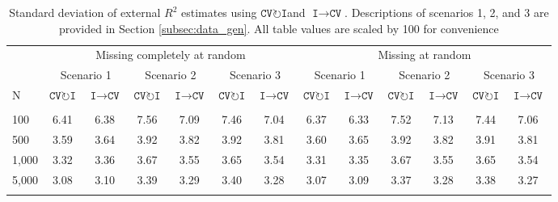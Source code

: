 \documentclass[AMA,STIX1COL,doublespace]{WileyNJD-v2}
\begin{document}
\begin{table}

\caption{\label{tab:variance}Standard deviation of external $R^2$ estimates using $\texttt{CV}\!\circlearrowright\!\texttt{I}$\space and $\texttt{I}\!\!\rightarrow\!\texttt{CV}$. Descriptions of scenarios 1, 2, and 3 are provided in Section \ref{subsec:data_gen}. All table values are scaled by 100 for convenience}
\centering
\begin{tabular}[t]{lcccccccccccc}
\toprule
\multicolumn{1}{c}{ } & \multicolumn{6}{c}{Missing completely at random} & \multicolumn{6}{c}{Missing at random} \\
\cmidrule(l{3pt}r{3pt}){2-7} \cmidrule(l{3pt}r{3pt}){8-13}
\multicolumn{1}{c}{ } & \multicolumn{2}{c}{Scenario 1} & \multicolumn{2}{c}{Scenario 2} & \multicolumn{2}{c}{Scenario 3} & \multicolumn{2}{c}{Scenario 1} & \multicolumn{2}{c}{Scenario 2} & \multicolumn{2}{c}{Scenario 3} \\
\cmidrule(l{3pt}r{3pt}){2-3} \cmidrule(l{3pt}r{3pt}){4-5} \cmidrule(l{3pt}r{3pt}){6-7} \cmidrule(l{3pt}r{3pt}){8-9} \cmidrule(l{3pt}r{3pt}){10-11} \cmidrule(l{3pt}r{3pt}){12-13}
N & $\texttt{CV}\!\circlearrowright\!\texttt{I}$& $\texttt{I}\!\!\rightarrow\!\texttt{CV}$& $\texttt{CV}\!\circlearrowright\!\texttt{I}$& $\texttt{I}\!\!\rightarrow\!\texttt{CV}$& $\texttt{CV}\!\circlearrowright\!\texttt{I}$& $\texttt{I}\!\!\rightarrow\!\texttt{CV}$& $\texttt{CV}\!\circlearrowright\!\texttt{I}$& $\texttt{I}\!\!\rightarrow\!\texttt{CV}$& $\texttt{CV}\!\circlearrowright\!\texttt{I}$& $\texttt{I}\!\!\rightarrow\!\texttt{CV}$& $\texttt{CV}\!\circlearrowright\!\texttt{I}$& $\texttt{I}\!\!\rightarrow\!\texttt{CV}$\\
\midrule
\addlinespace[0.75em]
\multicolumn{13}{l}{\textbf{10 predictors, 10 junk}}\\
\hline
\hspace{1em}100 & 6.41 & 6.38 & 7.56 & 7.09 & 7.46 & 7.04 & 6.37 & 6.33 & 7.52 & 7.13 & 7.44 & 7.06\\
\hspace{1em}500 & 3.59 & 3.64 & 3.92 & 3.82 & 3.92 & 3.81 & 3.60 & 3.65 & 3.92 & 3.82 & 3.91 & 3.81\\
\hspace{1em}1,000 & 3.32 & 3.36 & 3.67 & 3.55 & 3.65 & 3.54 & 3.31 & 3.35 & 3.67 & 3.55 & 3.65 & 3.54\\
\hspace{1em}5,000 & 3.08 & 3.10 & 3.39 & 3.29 & 3.40 & 3.28 & 3.07 & 3.09 & 3.37 & 3.28 & 3.38 & 3.27\\
\addlinespace[0.75em]

\end{tabular}
\end{table}
\end{document}
